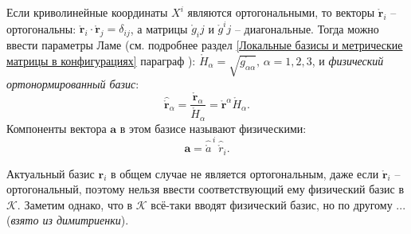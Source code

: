 
Если криволинейные координаты $X^i$ являются ортогональными, то векторы $\mathring{\mathbf{r}}_i$ -- ортогональны: $ \mathring{\mathbf{r}}_i\cdot\mathring{\mathbf{r}}_j=\delta_{ij}$, а матрицы $\mathring{g}_ij$ и $\mathring{g}^ij$ -- диагональные. Тогда можно ввести параметры Ламе (см. подробнее раздел \ref{Локальные базисы и метрические матрицы в конфигурациях} параграф ): $\mathring{H}_\alpha=\sqrt{\mathring{g_{\alpha\alpha}}},\,\alpha=1,2,3$, и \textit{физический ортонормированный базис}:
\begin{equation*}
	\widehat{\mathring{\mathbf{r}}}_\alpha=\frac{\mathring{\mathbf{r}}_\alpha}{\mathring{H}_\alpha}=\mathring{\mathbf{r}}^\alpha\mathring{H}_\alpha.
\end{equation*}
Компоненты вектора $\mathbf{a}$ в этом базисе называют физическими:
\begin{equation*}
	\mathbf{a} = \widehat{\mathring{a}}^{\,i}~\widehat{\mathring{r}}_i.
\end{equation*}

Актуальный базис $\mathbf{r}_i$ в общем случае не является ортогональным, даже если $\mathring{\mathbf{r}}_i$ -- ортогональный, поэтому нельзя ввести соответствующий ему физический базис в $\mathcal{K}$. Заметим однако, что в $\mathcal{K}$ всё-таки вводят физический базис, но по другому ... (\textit{взято из димитриенки}).